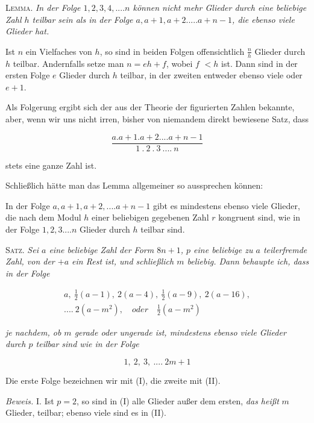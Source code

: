 \textsc{Lemma.} \textit{In der Folge $1,2,3,4,....n$ können nicht mehr Glieder durch eine beliebige Zahl $h$ teilbar sein als in der Folge $a,a+1,a+2.....a+n-1$, die ebenso viele Glieder hat.}

Ist $n$ ein Vielfaches von $h$, so sind in beiden Folgen offensichtlich $\frac nh$ Glieder durch $h$ teilbar. Andernfalls setze man $n=eh+f$, wobei $f$ $<h$ ist. Dann sind in der ersten Folge $e$ Glieder durch $h$ teilbar, in der zweiten entweder ebenso viele oder $e+1$.

Als Folgerung ergibt sich der aus der Theorie der figurierten Zahlen bekannte, aber, wenn wir uns nicht irren, bisher von niemandem direkt bewiesene Satz, dass

\[
\frac{a.a+1.a+2....a+n-1}{1\ .\ 2\ .\ 3\ ....\ n}
\]

stets eine ganze Zahl ist.

Schließlich hätte man das Lemma allgemeiner so aussprechen können:

In der Folge $a,a+1,a+2,....a+n-1$ gibt es mindestens ebenso viele Glieder, die nach dem Modul $h$ einer beliebigen gegebenen Zahl $r$ kongruent sind, wie in der Folge $1,2,3....n$ Glieder durch $h$ teilbar sind.

\textsc{Satz.} \textit{Sei $a$ eine beliebige Zahl der Form $8n+1$, $p$ eine beliebige zu $a$ teilerfremde Zahl, von der $+a$ ein Rest ist, und schließlich $m$ beliebig. Dann behaupte ich, dass in der Folge}

\[
\begin{gathered}a,\ \tfrac12(a-1),\ 2(a-4),\ \tfrac12(a-9),\ 2(a-16),\\ ....\ 2(a-m^2),\quad\textit{oder}\quad\tfrac12(a-m^2)\end{gathered}
\]

\textit{je nachdem, ob $m$ gerade oder ungerade ist, mindestens ebenso viele Glieder durch $p$ teilbar sind wie in der Folge}

\[
1,\ 2,\ 3,\ ....\ 2m+1
\]

Die erste Folge bezeichnen wir mit (I), die zweite mit (II).

\textit{Beweis.} I. Ist $p=2$, so sind in (I) alle Glieder außer dem ersten, \textit{das heißt} $m$ Glieder, teilbar; ebenso viele sind es in (II).


